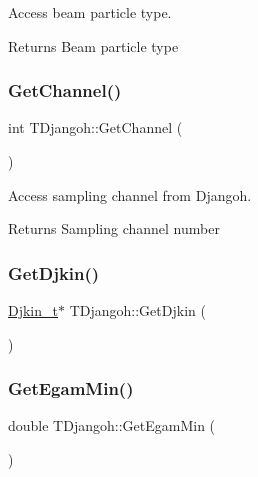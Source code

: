 Access beam particle type. 

\begin{DoxyReturn}{Returns}
Beam particle type 
\end{DoxyReturn}
\mbox{\label{class_t_djangoh_a381b6da1d6ef7145d9b4e49afb44a654}} 
\subsubsection{\texorpdfstring{Get\+Channel()}{GetChannel()}}
{\footnotesize\ttfamily int T\+Djangoh\+::\+Get\+Channel (\begin{DoxyParamCaption}{ }\end{DoxyParamCaption})}



Access sampling channel from Djangoh. 

\begin{DoxyReturn}{Returns}
Sampling channel number 
\end{DoxyReturn}
\mbox{\label{class_t_djangoh_a4f5a22f9af97e7c84660c94cd354f780}} 
\subsubsection{\texorpdfstring{Get\+Djkin()}{GetDjkin()}}
{\footnotesize\ttfamily \hyperlink{struct_djkin__t}{Djkin\+\_\+t}$\ast$ T\+Djangoh\+::\+Get\+Djkin (\begin{DoxyParamCaption}{ }\end{DoxyParamCaption})\hspace{0.3cm}{\ttfamily [inline]}}

\mbox{\label{class_t_djangoh_a47b4a219c93cbcad58a82bfab9649a42}} 
\subsubsection{\texorpdfstring{Get\+Egam\+Min()}{GetEgamMin()}}
{\footnotesize\ttfamily double T\+Djangoh\+::\+Get\+Egam\+Min (\begin{DoxyParamCaption}{ }\end{DoxyParamCaption})}



